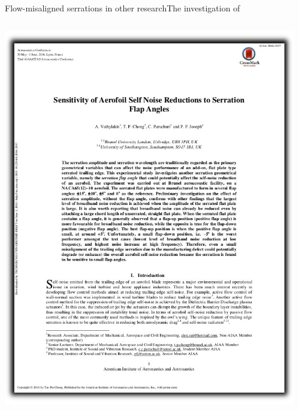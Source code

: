 \documentclass[xcolor=table,aspectratio=169]{beamer}
\begin{document}
\begin{frame}[c]{Flow-misaligned serrations in other research}{The investigation of \cite{Vathylakis2016}}
    \vspace{1cm}
    \begin{columns}
        \hspace{5mm}
        \begin{center}
            \includegraphics[width=1.00\textwidth]{media/VathylakisPage.png}
        \end{center}
        \begin{center}

\end{center}
\end{columns}
\end{frame}
\end{document}
